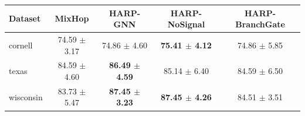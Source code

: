 \begin{tabular}{lcccc}
\toprule
Dataset & MixHop & HARP-GNN & HARP-NoSignal & HARP-BranchGate \\
\midrule
cornell & 74.59 $\pm$ 3.17 & 74.86 $\pm$ 4.60 & \textbf{75.41 $\pm$ 4.12} & 74.86 $\pm$ 5.85 \\
texas & 84.59 $\pm$ 4.60 & \textbf{86.49 $\pm$ 4.59} & 85.14 $\pm$ 6.40 & 84.59 $\pm$ 6.50 \\
wisconsin & 83.73 $\pm$ 5.47 & \textbf{87.45 $\pm$ 3.23} & \textbf{87.45 $\pm$ 4.26} & 84.51 $\pm$ 3.51 \\
\bottomrule
\end{tabular}
